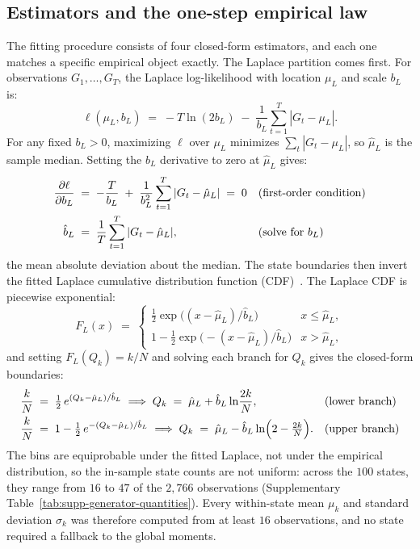 \subsection{Estimators and the one-step empirical law}
\label{sec:supp-gen-estimators}

The fitting procedure consists of four closed-form estimators, and
each one matches a specific empirical object exactly. The Laplace
partition comes first. For observations $G_1, \dots, G_T$, the Laplace
log-likelihood with location $\mu_L$ and scale $b_L$ is:
\begin{equation}
  \ell(\mu_L, b_L) \;=\;
  -T \ln (2 b_L) \;-\; \frac{1}{b_L} \sum_{t=1}^{T} |G_t - \mu_L|.
  \label{eq:supp-laplace-ll}
\end{equation}
For any fixed $b_L > 0$, maximizing $\ell$ over $\mu_L$ minimizes
$\sum_t |G_t - \mu_L|$, so $\hat\mu_L$ is the sample median. Setting
the $b_L$ derivative to zero at $\hat\mu_L$ gives:
\begin{align}
  \frac{\partial \ell}{\partial b_L}
   &\;=\; -\frac{T}{b_L}
     \;+\; \frac{1}{b_L^2} \sum_{t=1}^{T} |G_t - \hat\mu_L|
     \;=\; 0
     && \text{(first-order condition)} \notag \\
  \hat b_L
   &\;=\; \frac{1}{T} \sum_{t=1}^{T} |G_t - \hat\mu_L|,
     && \text{(solve for $b_L$)}
  \label{eq:supp-laplace-mle}
\end{align}
the mean absolute deviation about the median. The state boundaries
then invert the fitted Laplace cumulative distribution function
(CDF)~\cite{kotzKozubowskiPodgorski2001}. The Laplace CDF is
piecewise exponential:
\begin{equation}
  F_L(x) \;=\;
  \begin{cases}
    \tfrac{1}{2} \exp\!\big((x - \hat\mu_L)/\hat b_L\big)
      & x \le \hat\mu_L,\\[4pt]
    1 - \tfrac{1}{2} \exp\!\big(-(x - \hat\mu_L)/\hat b_L\big)
      & x > \hat\mu_L,
  \end{cases}
  \label{eq:supp-laplace-cdf}
\end{equation}
and setting $F_L(Q_k) = k/N$ and solving each branch for $Q_k$ gives
the closed-form boundaries:
\begin{align}
  \frac{k}{N} &\;=\; \tfrac{1}{2}\,
    e^{(Q_k - \hat\mu_L)/\hat b_L}
  \;\Longrightarrow\;
  Q_k \;=\; \hat\mu_L + \hat b_L \ln\!\frac{2k}{N},
    && \text{(lower branch)} \notag \\
  \frac{k}{N} &\;=\; 1 - \tfrac{1}{2}\,
    e^{-(Q_k - \hat\mu_L)/\hat b_L}
  \;\Longrightarrow\;
  Q_k \;=\; \hat\mu_L - \hat b_L
    \ln\!\Big(2 - \tfrac{2k}{N}\Big).
    && \text{(upper branch)}
  \label{eq:supp-quantiles}
\end{align}
The bins are equiprobable under the fitted Laplace, not under the
empirical distribution, so the in-sample state counts are not uniform:
across the $100$ states, they range from $16$ to $47$ of the $2{,}766$
observations (Supplementary Table~\ref{tab:supp-generator-quantities}). Every within-state mean $\mu_k$ and standard deviation
$\sigma_k$ was therefore computed from at least $16$ observations, and
no state required a fallback to the global moments.

